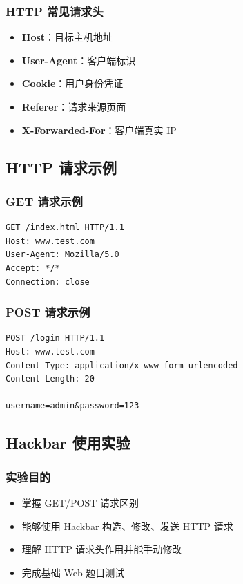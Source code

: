 \subsubsection{HTTP 常见请求头}
\begin{itemize}[leftmargin=*]
    \item \textbf{Host}：目标主机地址
    \item \textbf{User-Agent}：客户端标识
    \item \textbf{Cookie}：用户身份凭证
    \item \textbf{Referer}：请求来源页面
    \item \textbf{X-Forwarded-For}：客户端真实 IP
\end{itemize}

\newpage
\subsection{HTTP 请求示例}

\subsubsection{GET 请求示例}
\begin{verbatim}
GET /index.html HTTP/1.1
Host: www.test.com
User-Agent: Mozilla/5.0
Accept: */*
Connection: close
\end{verbatim}

\subsubsection{POST 请求示例}
\begin{verbatim}
POST /login HTTP/1.1
Host: www.test.com
Content-Type: application/x-www-form-urlencoded
Content-Length: 20

username=admin&password=123
\end{verbatim}

\newpage
\subsection{Hackbar 使用实验}

\subsubsection{实验目的}
\begin{itemize}[leftmargin=*]
    \item 掌握 GET/POST 请求区别
    \item 能够使用 Hackbar 构造、修改、发送 HTTP 请求
    \item 理解 HTTP 请求头作用并能手动修改
    \item 完成基础 Web 题目测试
\end{itemize}

